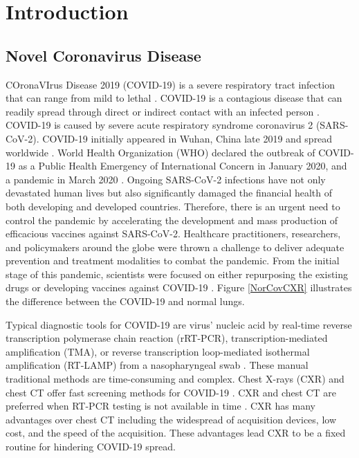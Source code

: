 
\chapter{Introduction} %




\label{chp:intro} %
\section{Novel Coronavirus Disease}

COronaVIrus Disease 2019 (COVID-19) is a severe respiratory tract infection that can range from mild to lethal \cite{acter2020evolution}. COVID-19 is a contagious disease that can readily spread through direct or indirect contact with an infected person \cite{singhal2020review}. COVID-19 is caused by severe acute respiratory syndrome coronavirus 2 (SARS-CoV-2). COVID-19 initially appeared in Wuhan, China late 2019 and spread worldwide \cite{hui2020continuing}. World Health Organization (WHO) declared the outbreak of COVID-19 as a Public Health Emergency of International Concern in January 2020, and a pandemic in March 2020 \cite{platto2020covid19}.
Ongoing SARS-CoV-2 infections have not only devastated human lives but also significantly damaged the financial health of both developing and developed countries. Therefore, there is an urgent need to control the pandemic by accelerating the development and mass production of efficacious vaccines against SARS-CoV-2. Healthcare practitioners, researchers, and policymakers around the globe were thrown a challenge to deliver adequate prevention and treatment modalities to combat the pandemic. From the initial stage of this pandemic, scientists were focused on either repurposing the existing drugs or developing vaccines against COVID-19 \cite{le2020evolution}. Figure \ref{NorCovCXR} illustrates the difference between the COVID-19 and normal lungs.

Typical diagnostic tools for COVID-19 are virus’ nucleic acid by real-time reverse transcription polymerase chain reaction (rRT-PCR), transcription-mediated amplification (TMA), or reverse transcription loop-mediated isothermal amplification (RT-LAMP) from a nasopharyngeal swab \cite{tahamtan2020real}.  These manual traditional methods are time-consuming and complex. Chest X-rays (CXR) and chest CT offer fast screening methods for COVID-19 \cite{salehi2020coronavirus}\cite{wu2020new}\cite{zu2020coronavirus}. CXR and chest CT are preferred when RT-PCR testing is not available in time \cite{erickson1993advanced}. CXR has many advantages over chest CT including the widespread of acquisition devices, low cost, and the speed of the acquisition\cite{narin2021automatic}\cite{brenner2007computed}\cite{rubin2020role}\cite{shi2020review}. These advantages lead CXR to be a fixed routine for hindering COVID-19 spread. 

